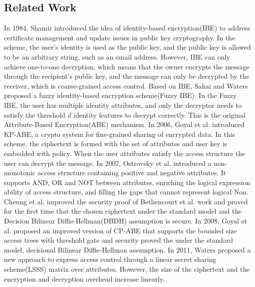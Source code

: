 \documentclass[smallextended]{svjour3}       %
\begin{document}
\subsection{Related Work}
	In 1984, Shamir introduced the idea of identity-based encryption(IBE) to address certificate management and update issues in public key cryptography.
	In the scheme, the user's identity is used as the public key, and the public key is allowed to be an arbitrary string, such as an email address.
	However, IBE can only achieve one-to-one decryption, which means that the owner encrypts the message through the recipient's public key, and the message can only be decrypted by the receiver, which is coarse-grained access control. 
	Based on IBE, Sahai and Waters proposed a fuzzy identity-based encryption scheme(Fuzzy IBE). 
	In the Fuzzy IBE, the user has multiple identity attributes, and only the decryptor needs to satisfy the threshold $d$ identity features to decrypt correctly. 
	This is the original Attribute-Based Encryption(ABE) mechanism. 
	In 2006, Goyal et al. introduced KP-ABE, a crypto system for fine-grained sharing of encrypted data. 
	In this scheme, the ciphertext is formed with the set of attributes and user key is embedded with policy. 
	When the user attributes satisfy the access structure the user can decrypt the message. 
	In 2007, Ostrovsky et al. introduced a non-monotonic access structure containing positive and negative attributes. 
	It supports AND, OR and NOT between attributes, enriching the logical expression ability of access structure, and filling the gaps that cannot represent logical Non. Cheung et al. improved the security proof of Bethencourt et al. work and proved for the first time that the chosen ciphertext under the standard model and the Decision Bilinear Diffie-Hellman(DBDH) assumption is secure. 
	In 2008, Goyal et al. proposed an improved version of CP-ABE that supports the bounded size access trees with threshold gate and security proved the under the standard model, decisional Bilinear Diffie-Hellman assumption. 
	In 2011, Waters proposed a new approach to express access control through a linear secret sharing scheme(LSSS) matrix over attributes. 
	However, the size of the ciphertext and the encryption and decryption overhead increase linearly.
\end{document}
